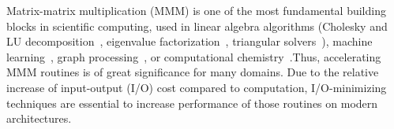 \documentclass[sigplan,review,anonymous,10pt]{acmart}\settopmatter{printfolios=true,printccs=false,printacmref=false}
\begin{document}

%


Matrix-matrix multiplication (MMM) is one of the most fundamental building
blocks in scientific computing, used in linear algebra algorithms (Cholesky and
LU decomposition~\cite{meyer2000matrix}, eigenvalue
factorization~\cite{chatelin2012eigenvalues}, triangular
solvers~\cite{linearAlgebraLAPACK}), machine
learning~\cite{abadi2016tensorflow}, graph
processing~\cite{cormen2009introduction, azad2015parallel,
kepner2016mathematical, ng2002spectral}, or computational 
chemistry~\cite{joost}.Thus, accelerating MMM routines is 
of great significance for many domains. Due to the relative increase of 
input-output (I/O) cost compared to computation, I/O-minimizing techniques are 
essential to increase performance of those routines on modern architectures.
\end{document}
